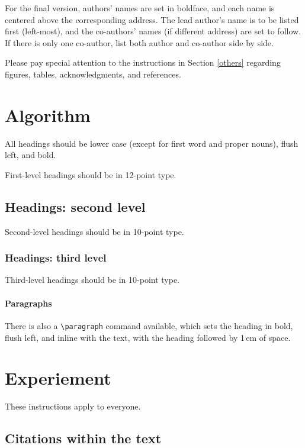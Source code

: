 \documentclass{article}
\begin{document}
For the final version, authors' names are set in boldface, and each name is
centered above the corresponding address. The lead author's name is to be listed
first (left-most), and the co-authors' names (if different address) are set to
follow. If there is only one co-author, list both author and co-author side by
side.

Please pay special attention to the instructions in Section \ref{others}
regarding figures, tables, acknowledgments, and references.

\section{Algorithm}\label{sec:algorithm}

All headings should be lower case (except for first word and proper nouns),
flush left, and bold.

First-level headings should be in 12-point type.

\subsection{Headings: second level}

Second-level headings should be in 10-point type.

\subsubsection{Headings: third level}

Third-level headings should be in 10-point type.

\paragraph{Paragraphs}

There is also a \verb+\paragraph+ command available, which sets the heading in
bold, flush left, and inline with the text, with the heading followed by 1\,em
of space.

\section{Experiement}\label{sec:experiment}

These instructions apply to everyone.

\subsection{Citations within the text}
\end{document}
